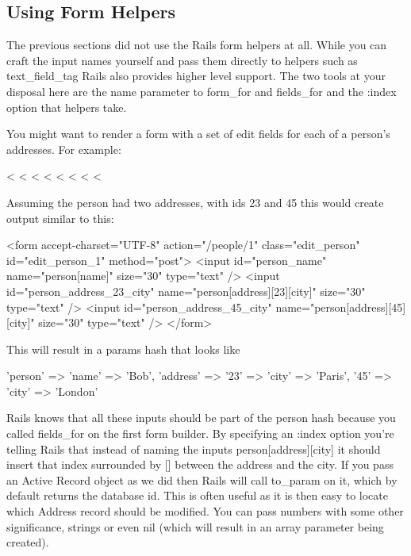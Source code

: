 \documentclass[10pt]{book}
\newenvironment{code}{%
  \scriptsize
    \verbatim
}{%
    \endverbatim
    \newline
}
\begin{document}
\subsection{ Using Form Helpers}

The previous sections did not use the Rails form helpers at all.  While you can craft the input names yourself and pass them directly to  helpers such as text\_field\_tag Rails also provides higher level support. The two tools at your disposal here are the name parameter to form\_for and fields\_for and the :index option that helpers take.

You might want to render a form with a set of edit fields for each of a person’s addresses. For example:
\begin{code}
<%
  <%
  <%
  <%
      <%
  <%
  <%
<%
\end{code}

Assuming the person had two addresses, with ids 23 and 45 this would create output similar to this:
\begin{code}
<form accept-charset="UTF-8" action="/people/1" 
      class="edit_person" id="edit_person_1" method="post">
<input id="person_name" name="person[name]" size="30" type="text" />
<input id="person_address_23_city" 
  name="person[address][23][city]" size="30" type="text" />
<input id="person_address_45_city" 
  name="person[address][45][city]" size="30" type="text" />
</form>
\end{code}

This will result in a params hash that looks like
\begin{code}
{'person' => {'name' => 'Bob', 'address' => 
    {'23' => {'city' => 'Paris'}, '45' => {'city' => 'London'}}}}
\end{code}

Rails knows that all these inputs should be part of the person hash because you called fields\_for on the first form builder. By specifying an :index option you’re telling Rails that instead of naming the inputs person[address][city]  it should insert that index surrounded by [] between the address and  the city. If you pass an Active Record object as we did then Rails will  call to\_param on it, which by default returns the database id.  This is often useful as it is then easy to locate which Address record  should be modified. You can pass numbers with some other significance,  strings or even nil (which will result in an array parameter being created).
\end{document}
